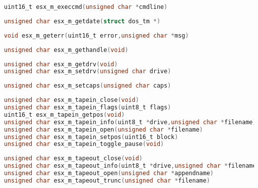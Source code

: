 \documentclass[11pt]{book}
\def\lthtmlcheckvsize{\ifdim\ht\sizebox<\vsize 
  \ifdim\wd\sizebox<\hsize\expandafter\hfill\fi \expandafter\vfill
  \else\expandafter\vss\fi}%
\begin{document}
{\newpage\clearpage
{}%
\begin{lstlisting}[language=C]
uint16_t esx_m_execcmd(unsigned char *cmdline)
\end{lstlisting}%
\lthtmlfigureZ
\lthtmlcheckvsize\clearpage}

{\newpage\clearpage
{}%
\begin{lstlisting}[language=C]
unsigned char esx_m_getdate(struct dos_tm *)
\end{lstlisting}%
\lthtmlfigureZ
\lthtmlcheckvsize\clearpage}

{\newpage\clearpage
{}%
\begin{lstlisting}[language=C]
void esx_m_geterr(uint16_t error,unsigned char *msg)
\end{lstlisting}%
\lthtmlfigureZ
\lthtmlcheckvsize\clearpage}

{\newpage\clearpage
{}%
\begin{lstlisting}[language=C]
unsigned char esx_m_gethandle(void)
\end{lstlisting}%
\lthtmlfigureZ
\lthtmlcheckvsize\clearpage}

{\newpage\clearpage
{}%
\begin{lstlisting}[language=C]
unsigned char esx_m_getdrv(void)
unsigned char esx_m_setdrv(unsigned char drive)
\end{lstlisting}%
\lthtmlfigureZ
\lthtmlcheckvsize\clearpage}

{\newpage\clearpage
{}%
\begin{lstlisting}[language=C]
unsigned char esx_m_setcaps(unsigned char caps)
\end{lstlisting}%
\lthtmlfigureZ
\lthtmlcheckvsize\clearpage}

{\newpage\clearpage
{}%
\begin{lstlisting}[language=C]
unsigned char esx_m_tapein_close(void)
unsigned char esx_m_tapein_flags(uint8_t flags)
uint16_t esx_m_tapein_getpos(void)
unsigned char esx_m_tapein_info(uint8_t *drive,unsigned char *filename)
unsigned char esx_m_tapein_open(unsigned char *filename)
unsigned char esx_m_tapein_setpos(uint16_t block)
unsigned char esx_m_tapein_toggle_pause(void)
\end{lstlisting}%
\lthtmlfigureZ
\lthtmlcheckvsize\clearpage}

{\newpage\clearpage
{}%
\begin{lstlisting}[language=C]
unsigned char esx_m_tapeout_close(void)
unsigned char esx_m_tapeout_info(uint8_t *drive,unsigned char *filename)
unsigned char esx_m_tapeout_open(unsigned char *appendname)
unsigned char esx_m_tapeout_trunc(unsigned char *filename)
\end{lstlisting}%
\lthtmlfigureZ
\lthtmlcheckvsize\clearpage}
\end{document}
